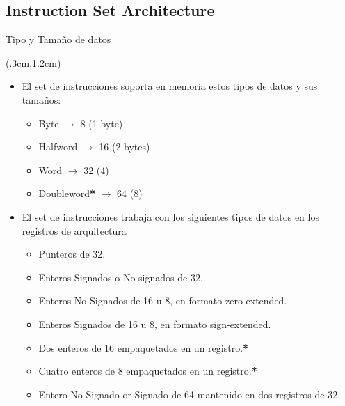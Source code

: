 \documentclass[usenames,table,dvipsnames,aspectratio=169]{beamer}
\begin{document}
\subsection{Instruction Set Architecture}
\begin{frame}{Tipo y Tamaño de datos}
 \begin{textblock*}{\textwidth}(.3cm,1.2cm)
  \begin{itemize}[<+(1)->]
   \item El set de instrucciones soporta en memoria estos tipos de datos y sus tamaños:
   \begin{itemize}
    \item Byte $\rightarrow$ \SI{8}{\bit} (1 byte)
    \item Halfword $\rightarrow$ \SI{16}{\bit} (2 bytes)
    \item Word $\rightarrow$ \SI{32}{\bit} (\SI{4}{\byte})
    \item {\color{red} Doubleword\textbf{*} $\rightarrow$ \SI{64}{\bit} (\SI{8}{\byte})} \color{black}
  \end{itemize}
  \item El set de instrucciones trabaja con los siguientes tipos de datos en los registros de arquitectura
  \begin{itemize}
   \item Punteros de \SI{32}{\bit}.
   \item Enteros Signados o No signados de \SI{32}{\bit}.
   \item Enteros No Signados de \SI{16}{\bit} u \SI{8}{\bit}, en formato zero-extended.
   \item Enteros Signados de \SI{16}{\bit} u \SI{8}{\bit}, en formato sign-extended.
   \item {\color{red} Dos enteros de \SI{16}{\bit} empaquetados en un registro.\textbf{*} }
   \item {\color{red} Cuatro enteros de \SI{8}{\bit} empaquetados en un registro.\textbf{*} } \color{black}
   \item Entero No Signado or Signado de \SI{64}{\bit} mantenido en dos registros de \SI{32}{\bit}.
  \end{itemize}
 \end{itemize}
 \end{textblock*}
\end{frame}
\end{document}
